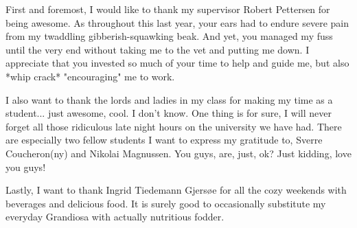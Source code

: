 \begin{acknowledgement}
First and foremost, I would like to thank my supervisor Robert Pettersen for being awesome. As throughout this last year, your ears had to endure severe pain from my twaddling gibberish-squawking beak. And yet, you managed my fuss until the very end without taking me to the vet and putting me down. I appreciate that you invested so much of your time to help and guide me, but also *whip crack* "encouraging" me to work.

I also want to thank the lords and ladies in my class for making my time as a student... just awesome, cool. I don't know. One thing is for sure, I will never forget all those ridiculous late night hours on the university we have had. There are especially two fellow students I want to express my gratitude to, Sverre Coucheron(ny) and Nikolai Magnussen. You guys, are, just, ok? Just kidding, love you guys!

Lastly, I want to thank Ingrid Tiedemann Gjersøe for all the cozy weekends with beverages and delicious food. It is surely good to occasionally substitute my everyday Grandiosa with actually nutritious fodder.
\end{acknowledgement}